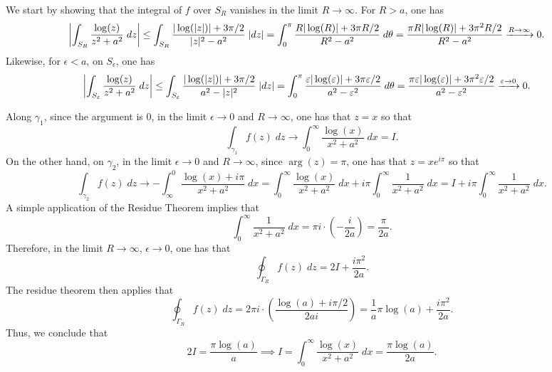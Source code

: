 \documentclass{article}
\begin{document}
	We start by showing that the integral of $f$ over $S_{R}$ vanishes in the limit $R \to \infty$. For $R > a$, one has 
	\begin{align*}
		\begin{split}
			\left| \int_{S_{R}}\frac{\log(z)}{z^{2} + a^{2}}\;dz \right| &\leq \int_{S_{R}}\frac{|\log(|z|)| + 3\pi/2}{|z|^{2} - a^{2}}\;|dz| = \int_{0}^{\pi}\frac{R|\log(R)| + 3\pi R/2}{R^{2} - a^{2}}\;d\theta = \frac{\pi R |\log(R)| + 3\pi^{2} R/2}{R^{2} - a^{2}} \xrightarrow{R \to \infty} 0. 
		\end{split}
	\end{align*}
	Likewise, for $\epsilon < a$, on $S_{\epsilon}$, one has 
	\begin{align*}
		\begin{split}
			\left| \int_{S_{\varepsilon}}\frac{\log(z)}{z^{2} + a^{2}}\;dz \right| &\leq \int_{S_{\varepsilon}}\frac{|\log(|z|)| + 3\pi/2}{a^{2} - |z|^{2}}\;|dz| = \int_{0}^{\pi}\frac{\varepsilon|\log(\varepsilon)| + 3\pi \varepsilon/2}{a^{2} - \varepsilon^{2}}\;d\theta = \frac{\pi \varepsilon |\log(\varepsilon)| + 3\pi^{2}\varepsilon/2}{a^{2} - \varepsilon^{2}} \xrightarrow{\varepsilon \to 0} 0. 
		\end{split}
	\end{align*}
	
	Along $\gamma_{1}$, since the argument is $0$, in the limit $\epsilon \to 0$ and $R \to \infty$, one has that $z = x$ so that 
	\begin{equation*}
		\int_{\gamma_{1}}f(z)\;dz \to \int_{0}^{\infty}\frac{\log(x)}{x^{2} + a^{2}}\;dx = I. 
	\end{equation*}
	On the other hand, on $\gamma_{2}$, in the limit $\epsilon \to 0$ and $R \to \infty$, since $\arg(z) = \pi$, one has that $z = xe^{i\pi}$ so that 
	\begin{equation*}
		\int_{\gamma_{2}}f(z)\;dz \to -\int_{\infty}^{0}\frac{\log(x) + i\pi}{x^{2} + a^{2}}\;dx = \int_{0}^{\infty}\frac{\log(x)}{x^{2} + a^{2}}\;dx + i\pi \int_{0}^{\infty}\frac{1}{x^{2} + a^{2}}\;dx = I + i\pi \int_{0}^{\infty}\frac{1}{x^{2} + a^{2}}\;dx. 
	\end{equation*}
	A simple application of the Residue Theorem implies that 
	\begin{equation*}
		\int_{0}^{\infty}\frac{1}{x^{2} + a^{2}}\;dx = \pi i \cdot \left(-\frac{i}{2a}\right) = \frac{\pi}{2a}. 
	\end{equation*}
	Therefore, in the limit $R \to \infty$, $\epsilon \to 0$, one has that 
	\begin{equation*}
		\oint_{\Gamma_{R}}f(z)\;dz = 2I + \frac{i\pi^{2}}{2a}. 
	\end{equation*}
	The residue theorem then applies that 
	\begin{equation*}
		\oint_{\Gamma_{R}}f(z)\;dz = 2\pi i \cdot \left(\frac{\log(a) + i\pi/2}{2ai}\right) = \frac{1}{a}\pi\log(a) + \frac{i\pi^{2}}{2a}. 
	\end{equation*}
	Thus, we conclude that 
	\begin{equation}
		2I = \frac{\pi\log(a)}{a} \implies I = \int_{0}^{\infty}\frac{\log(x)}{x^{2} + a^{2}}\;dx = \frac{\pi\log(a)}{2a}. 
	\end{equation}
	
\end{document}
